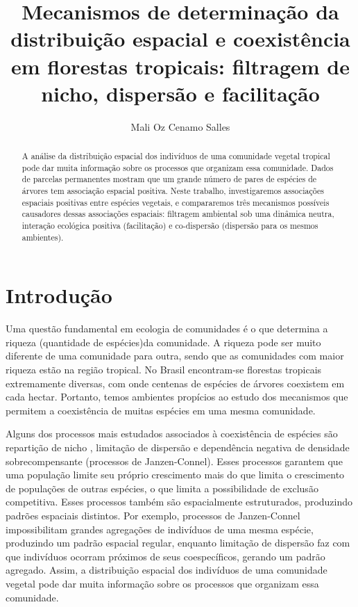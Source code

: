 \documentclass[twoside,12pt,a4paper]{report}
\begin{document}
\title{Mecanismos de determinação da distribuição espacial e coexistência em florestas tropicais:
filtragem de nicho, dispersão e facilitação}
\author{Mali Oz Cenamo Salles}


\begin{abstract}

A análise da distribuição espacial dos indivíduos de uma comunidade vegetal tropical pode dar muita
informação sobre os processos que organizam essa comunidade. Dados de parcelas permanentes mostram
que um grande número de pares de espécies de árvores tem associação espacial positiva. Neste
trabalho, investigaremos associações espaciais positivas entre espécies vegetais, e compararemos
três mecanismos possíveis causadores dessas associações espaciais: filtragem ambiental sob uma
dinâmica neutra, interação ecológica positiva (facilitação) e co-dispersão (dispersão para os mesmos
ambientes).

\end{abstract}

\section{Introdução}

Uma questão fundamental em ecologia de comunidades é o que determina a riqueza (quantidade de
espécies)da comunidade. 
A riqueza pode ser muito diferente de uma comunidade para outra, sendo que as comunidades com
maior riqueza estão na região tropical.
No Brasil encontram-se florestas tropicais extremamente diversas, com onde centenas de
espécies de árvores coexistem em cada hectar. Portanto, temos ambientes propícios ao estudo dos mecanismos
que permitem a coexistência de muitas espécies em uma mesma comunidade.

Alguns dos processos mais estudados associados à coexistência de espécies são repartição de
nicho \citep{Hutchinson1957}, limitação de dispersão \citep{refs} e dependência negativa de densidade sobrecompensante
(processos de Janzen-Connel)\citep{refs}. 
Esses processos garantem que uma população limite seu próprio crescimento mais do que limita o
crescimento de populações de outras espécies, o que limita a possibilidade de exclusão
competitiva. 
Esses processos também são espacialmente
estruturados, produzindo padrões espaciais distintos. Por exemplo, processos de
Janzen-Connel impossibilitam grandes agregações de indivíduos de uma mesma espécie,
produzindo um padrão espacial regular, enquanto limitação de dispersão faz com que
indivíduos ocorram próximos de seus coespecíficos, gerando um padrão agregado.
Assim, a distribuição espacial dos indivíduos de uma comunidade vegetal pode dar muita
informação sobre os processos que organizam essa comunidade. 
\end{document}

